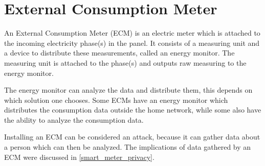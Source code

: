 \section{External Consumption Meter}\label{ecm}
An External Consumption Meter (ECM) is an electric meter which is attached to the incoming electricity phase(s) in the panel.
It consists of a measuring unit and a device to distribute these measurements, called an energy monitor.
The measuring unit is attached to the phase(s) and outputs raw measuring to the energy monitor.

The energy monitor can analyze the data and distribute them, this depends on which solution one chooses.
Some ECMs have an energy monitor which distributes the consumption data outside the home network, while some also have the ability to analyze the consumption data.\cite{TED,efergy,open_energy_monitor}

Installing an ECM can be considered an attack, because it can gather data about a person which can then be analyzed.
The implications of data gathered by an ECM were discussed in \cref{smart_meter_privacy}.
